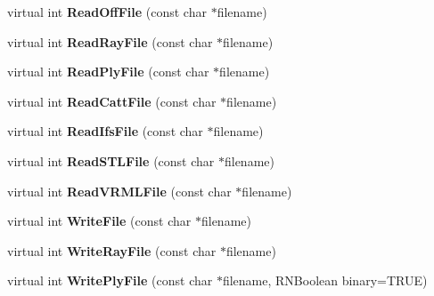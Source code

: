 \begin{DoxyCompactItemize}
\item 
virtual int {\bfseries Read\+Off\+File} (const char $\ast$filename)\hypertarget{class_r3_mesh_a75ed8bf91a00cb0c65bdf90de21a7787}{}\label{class_r3_mesh_a75ed8bf91a00cb0c65bdf90de21a7787}

\item 
virtual int {\bfseries Read\+Ray\+File} (const char $\ast$filename)\hypertarget{class_r3_mesh_af4660f956a870fc80c3832817c863cf3}{}\label{class_r3_mesh_af4660f956a870fc80c3832817c863cf3}

\item 
virtual int {\bfseries Read\+Ply\+File} (const char $\ast$filename)\hypertarget{class_r3_mesh_a8133bf5b0f46da6c20959ac37b6c5892}{}\label{class_r3_mesh_a8133bf5b0f46da6c20959ac37b6c5892}

\item 
virtual int {\bfseries Read\+Catt\+File} (const char $\ast$filename)\hypertarget{class_r3_mesh_a8c0279883ad6c2b12eeb7eb8a366c4f9}{}\label{class_r3_mesh_a8c0279883ad6c2b12eeb7eb8a366c4f9}

\item 
virtual int {\bfseries Read\+Ifs\+File} (const char $\ast$filename)\hypertarget{class_r3_mesh_a3044d3128bbdc67b1bb4a180792ebfbc}{}\label{class_r3_mesh_a3044d3128bbdc67b1bb4a180792ebfbc}

\item 
virtual int {\bfseries Read\+S\+T\+L\+File} (const char $\ast$filename)\hypertarget{class_r3_mesh_a7e85bb16ddd5346a9ab2876a972b07dd}{}\label{class_r3_mesh_a7e85bb16ddd5346a9ab2876a972b07dd}

\item 
virtual int {\bfseries Read\+V\+R\+M\+L\+File} (const char $\ast$filename)\hypertarget{class_r3_mesh_aff7b545e92181002268a4d9239891379}{}\label{class_r3_mesh_aff7b545e92181002268a4d9239891379}

\item 
virtual int {\bfseries Write\+File} (const char $\ast$filename)\hypertarget{class_r3_mesh_a3e866b16b717c539f79db871d852a4ca}{}\label{class_r3_mesh_a3e866b16b717c539f79db871d852a4ca}

\item 
virtual int {\bfseries Write\+Ray\+File} (const char $\ast$filename)\hypertarget{class_r3_mesh_a39fff8b8504d9f1767681bdb0360a6aa}{}\label{class_r3_mesh_a39fff8b8504d9f1767681bdb0360a6aa}

\item 
virtual int {\bfseries Write\+Ply\+File} (const char $\ast$filename, R\+N\+Boolean binary=T\+R\+UE)\hypertarget{class_r3_mesh_a63fe685a92e2068919fd8379fe433ca6}{}\label{class_r3_mesh_a63fe685a92e2068919fd8379fe433ca6}


\end{DoxyCompactItemize}
